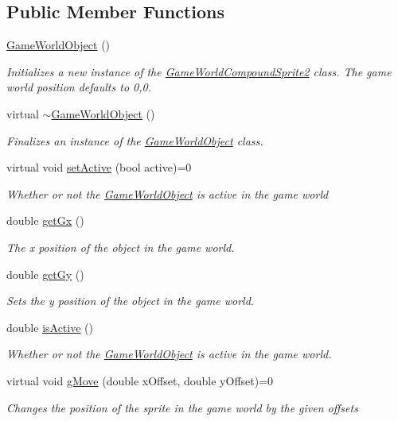 \subsection*{Public Member Functions}
\begin{DoxyCompactItemize}
\item 
\hyperlink{class_game_world_object_a1c273875f7dd21cb8ec9f03b6ff26a18}{Game\+World\+Object} ()
\begin{DoxyCompactList}\small\item\em Initializes a new instance of the \hyperlink{class_game_world_compound_sprite2}{Game\+World\+Compound\+Sprite2} class. The game world position defaults to 0,0. \end{DoxyCompactList}\item 
virtual \hyperlink{class_game_world_object_aa0a604119a1f66b3a299e8a192c4b554}{$\sim$\+Game\+World\+Object} ()
\begin{DoxyCompactList}\small\item\em Finalizes an instance of the \hyperlink{class_game_world_object}{Game\+World\+Object} class. \end{DoxyCompactList}\item 
virtual void \hyperlink{class_game_world_object_a79d89ff68b9334b454300cf855719b77}{set\+Active} (bool active)=0
\begin{DoxyCompactList}\small\item\em Whether or not the \hyperlink{class_game_world_object}{Game\+World\+Object} is active in the game world\end{DoxyCompactList}\item 
double \hyperlink{class_game_world_object_a292eb95c0bb79fdceb72c35591bb1c88}{get\+Gx} ()
\begin{DoxyCompactList}\small\item\em The x position of the object in the game world. \end{DoxyCompactList}\item 
double \hyperlink{class_game_world_object_a2bfa46580715a74de892201b8043d2d2}{get\+Gy} ()
\begin{DoxyCompactList}\small\item\em Sets the y position of the object in the game world. \end{DoxyCompactList}\item 
double \hyperlink{class_game_world_object_a2c44a748bb3070545761d7e7c22c7f99}{is\+Active} ()
\begin{DoxyCompactList}\small\item\em Whether or not the \hyperlink{class_game_world_object}{Game\+World\+Object} is active in the game world. \end{DoxyCompactList}\item 
virtual void \hyperlink{class_game_world_object_a3ddbcf57e6eb43cb4aaec7ac347d4e17}{g\+Move} (double x\+Offset, double y\+Offset)=0
\begin{DoxyCompactList}\small\item\em Changes the position of the sprite in the game world by the given offsets\end{DoxyCompactList}\end{DoxyCompactItemize}
